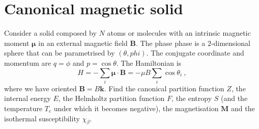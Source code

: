 \section{Canonical magnetic solid}

    \begin{exercise}
        Consider a solid composed by $N$ atoms or molecules with an intrinsic magnetic moment $\boldsymbol \mu$ in an external magnetic field $\mathbf B$. The phase phase is a $2$-dimensional sphere that can be parametrised by $(\theta, phi)$. The conjugate coordinate and momentum are $q = \phi$ and $p = \cos \theta$. The Hamiltonian is 
        \begin{equation*}
            H = - \sum_i \boldsymbol \mu \cdot \mathbf B = - \mu B \sum_i \cos \theta_i ~,
        \end{equation*}
        where we have oriented $\mathbf B = B \mathbf k$. Find the canonical partition function $Z$, the internal energy $E$, the Helmholtz partition function $F$, the entropy $S$ (and the temperature $T_c$ under which it becomes negative), the magnetisation $\mathbf M$ and the isothermal susceptibility $\chi_\beta$. 
    \end{exercise}

